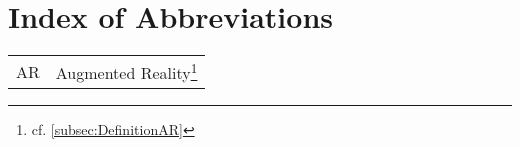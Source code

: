 \section*{Index of Abbreviations}
\begin{longtable}{@{}p{}@{}p{}@{}}
AR & Augmented Reality\footnote{cf. \ref{subsec:DefinitionAR}}
\end{longtable}